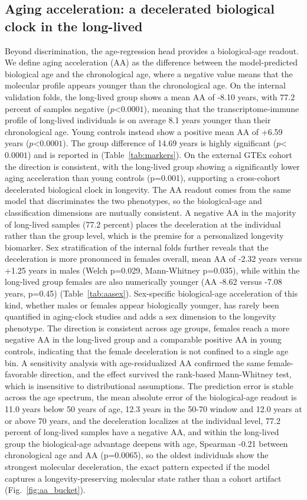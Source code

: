 \documentclass[unnumsec,webpdf,contemporary,large]{oup-authoring-template}
\begin{document}
\subsection{Aging acceleration: a decelerated biological clock in the long-lived}\label{sec:resaa}
Beyond discrimination, the age-regression head provides a biological-age readout. We define aging acceleration (AA) as the difference between the model-predicted biological age and the chronological age, where a negative value means that the molecular profile appears younger than the chronological age. On the internal validation folds, the long-lived group shows a mean AA of -8.10 years, with 77.2 percent of samples negative ($p$<$0.0001$), meaning that the transcriptome-immune profile of long-lived individuals is on average 8.1 years younger than their chronological age. Young controls instead show a positive mean AA of +6.59 years ($p$<$0.0001$). The group difference of 14.69 years is highly significant ($p$<$0.0001$) and is reported in (Table~\ref{tab:markers}). On the external GTEx cohort the direction is consistent, with the long-lived group showing a significantly lower aging acceleration than young controls (p=0.001), supporting a cross-cohort decelerated biological clock in longevity. The AA readout comes from the same model that discriminates the two phenotypes, so the biological-age and classification dimensions are mutually consistent. A negative AA in the majority of long-lived samples (77.2 percent) places the deceleration at the individual rather than the group level, which is the premise for a personalized longevity biomarker. Sex stratification of the internal folds further reveals that the deceleration is more pronounced in females overall, mean AA of -2.32 years versus +1.25 years in males (Welch p=0.029, Mann-Whitney p=0.035), while within the long-lived group females are also numerically younger (AA -8.62 versus -7.08 years, p=0.45) (Table~\ref{tab:aasex}). Sex-specific biological-age acceleration of this kind, whether males or females appear biologically younger, has rarely been quantified in aging-clock studies and adds a sex dimension to the longevity phenotype. The direction is consistent across age groups, females reach a more negative AA in the long-lived group and a comparable positive AA in young controls, indicating that the female deceleration is not confined to a single age bin. A sensitivity analysis with age-residualized AA confirmed the same female-favorable direction, and the effect survived the rank-based Mann-Whitney test, which is insensitive to distributional assumptions. The prediction error is stable across the age spectrum, the mean absolute error of the biological-age readout is 11.0 years below 50 years of age, 12.3 years in the 50-70 window and 12.0 years at or above 70 years, and the deceleration localizes at the individual level, 77.2 percent of long-lived samples have a negative AA, and within the long-lived group the biological-age advantage deepens with age, Spearman -0.21 between chronological age and AA (p=0.0065), so the oldest individuals show the strongest molecular deceleration, the exact pattern expected if the model captures a longevity-preserving molecular state rather than a cohort artifact (Fig.~\ref{fig:aa_bucket}).
\end{document}

